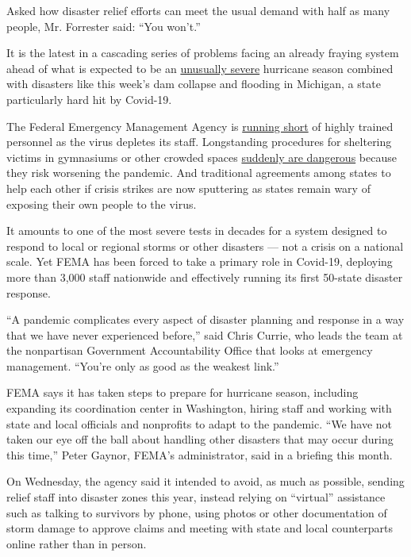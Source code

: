 Asked how disaster relief efforts can meet the usual demand with half as
many people, Mr. Forrester said: ``You won't.''

It is the latest in a cascading series of problems facing an already
fraying system ahead of what is expected to be an
\href{https://www.nytimes.com/2020/05/21/climate/hurricane-season-2020-noaa.html}{unusually
severe} hurricane season combined with disasters like this week's dam
collapse and flooding in Michigan, a state particularly hard hit by
Covid-19.

The Federal Emergency Management Agency is
\href{https://www.nytimes.com/2020/04/03/climate/fema-staff-shortage-coronavirus.html}{running
short} of highly trained personnel as the virus depletes its staff.
Longstanding procedures for sheltering victims in gymnasiums or other
crowded spaces
\href{https://www.nytimes.com/2020/03/21/climate/virus-fema-disaster-aid-shelter.html}{suddenly
are dangerous} because they risk worsening the pandemic. And traditional
agreements among states to help each other if crisis strikes are now
sputtering as states remain wary of exposing their own people to the
virus.

It amounts to one of the most severe tests in decades for a system
designed to respond to local or regional storms or other disasters ---
not a crisis on a national scale. Yet FEMA has been forced to take a
primary role in Covid-19, deploying more than 3,000 staff nationwide and
effectively running its first 50-state disaster response.

``A pandemic complicates every aspect of disaster planning and response
in a way that we have never experienced before,'' said Chris Currie, who
leads the team at the nonpartisan Government Accountability Office that
looks at emergency management. ``You're only as good as the weakest
link.''

FEMA says it has taken steps to prepare for hurricane season, including
expanding its coordination center in Washington, hiring staff and
working with state and local officials and nonprofits to adapt to the
pandemic. ``We have not taken our eye off the ball about handling other
disasters that may occur during this time,'' Peter Gaynor, FEMA's
administrator, said in a briefing this month.

On Wednesday, the agency said it intended to avoid, as much as possible,
sending relief staff into disaster zones this year, instead relying on
``virtual'' assistance such as talking to survivors by phone, using
photos or other documentation of storm damage to approve claims and
meeting with state and local counterparts online rather than in person.


